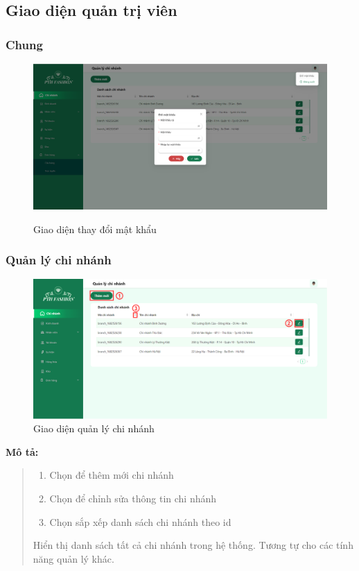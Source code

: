 \newpage


\subsection{Giao diện quản trị viên}
\subsubsection{Chung}
\begin{figure}[!htp]
    \centering
    \includegraphics[width=12cm]{img/UI/admin_implement/changePassword.png}
    \label{20}
    \newline
    \caption{Giao diện thay đổi mật khẩu}
\end{figure}


\subsubsection{Quản lý chi nhánh}
\begin{figure}[!htp]
    \centering
    \includegraphics[width=12cm]{img/UI/admin_implement/branch.png}
    \newline
    \caption{Giao diện quản lý chi nhánh}
\end{figure}

\textbf{Mô tả:}
\begin{quote}
    \begin{enumerate}
        \item Chọn để thêm mới chi nhánh
        \item Chọn để chỉnh sửa thông tin chi nhánh
        \item Chọn sắp xếp danh sách chi nhánh theo id
    \end{enumerate}
    Hiển thị danh sách tất cả chi nhánh trong hệ thống. Tương tự cho các tính năng quản lý khác.
\end{quote}

